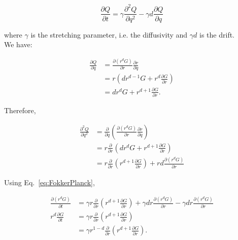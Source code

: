 \begin{equation}
\frac{\partial Q}{\partial t}=\gamma\frac{\partial^{2}Q}{\partial q^{2}}-\gamma d\frac{\partial Q}{\partial q}\label{eq:FokkerPlanck}
\end{equation}

where $\gamma$ is the stretching parameter, i.e. the diffusivity and $\gamma d$ is the drift. \\

We have:

\begin{subequations} 
\begin{align}
\frac{\partial Q}{\partial q} & =\frac{\partial(r^{d}G)}{\partial r}\frac{\partial r}{\partial q}\label{computedGdQ1}\\
 & =r\left(dr^{d-1}G+r^{d}\frac{\partial G}{\partial r}\right)\label{computedGdQ2}\\
 & =dr^{d}G+r^{d+1}\frac{\partial G}{\partial r}.
\end{align}
 \end{subequations}

Therefore,

\begin{subequations}

\begin{align}
\frac{\partial^{2}Q}{\partial q^{2}} & =\frac{\partial}{\partial q}\left(\frac{\partial(r^{d}G)}{\partial r}\frac{\partial r}{\partial q}\right)\label{computedGdQ1-1}\\
 & =r\frac{\partial}{\partial r}\left(dr^{d}G+r^{d+1}\frac{\partial G}{\partial r}\right)\label{computedGdQ2-1}\\
 & =r\frac{\partial}{\partial r}\left(r^{d+1}\frac{\partial G}{\partial r}\right)+rd\frac{\partial(r^{d}G)}{\partial r}
\end{align}

\end{subequations}

Using Eq.~\ref{eq:FokkerPlanck},

\begin{subequations}

\begin{align}
\frac{\partial(r^{d}G)}{\partial t} & =\gamma r\frac{\partial}{\partial r}\left(r^{d+1}\frac{\partial G}{\partial r}\right)+\gamma dr\frac{\partial(r^{d}G)}{\partial r}-\gamma dr\frac{\partial(r^{d}G)}{\partial r}\label{computedGdQ1-1-1}\\
r^{d}\frac{\partial G}{\partial t} & =\gamma r\frac{\partial}{\partial r}\left(r^{d+1}\frac{\partial G}{\partial r}\right)\label{computedGdQ2-1-1}\\
 & =\gamma r^{1-d}\frac{\partial}{\partial r}\left(r^{d+1}\frac{\partial G}{\partial r}\right).\label{last_adv}
\end{align}

\end{subequations}

